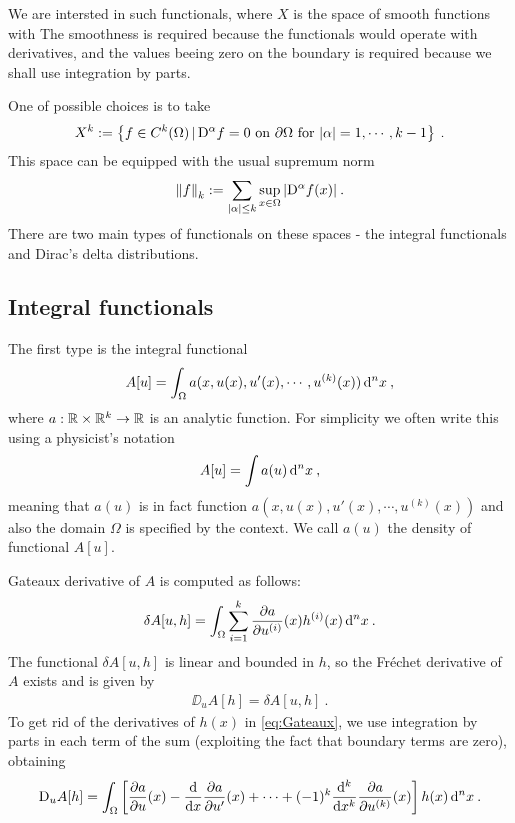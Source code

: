 We are intersted in such functionals, where $X$ is the space of smooth functions with The smoothness is required because the functionals would operate with derivatives, and the values beeing zero on the boundary is required because we shall use integration by parts.

One of possible choices is to take
\begin{align}
    X^k := \left \lbrace f \in C^k(\Omega) \,|\, \mathrm{D}^\alpha f = 0 \text{ on } \partial \Omega \text{ for } |\alpha| = 1, \cdots, k-1  \right \rbrace \:.
\end{align}
This space can be equipped with the usual supremum norm
\begin{align}
    \left \Vert f \right \Vert_k := \sum_{|\alpha| \leq k} \sup_{x \in \Omega} |\mathrm{D}^\alpha f(x)| \:.
\end{align}
There are two main types of functionals on these spaces -  the integral functionals and Dirac's delta distributions.

\subsection{Integral functionals}

The first type is the integral functional
\begin{align}
    A[u] = \int_\Omega a(x,u(x),u'(x),\cdots,u^{(k)}(x)) \, \mathrm{d}^n x \:, \label{eq:integral-functional}
\end{align}
where $a : \mathbb{R} \times \mathbb{R}^{k} \to \mathbb{R}$ is an analytic function.
For simplicity we often write this using a physicist's notation
\begin{align}
    A[u] = \int a(u) \, \mathrm{d}^n x \:,
\end{align}
meaning that $a(u)$ is in fact function $a(x,u(x),u'(x),\cdots, u^{(k)}(x))$ and also the domain $\Omega$ is specified by the context. We call $a(u)$ the density of functional $A[u]$.

Gateaux derivative of $A$ is computed as follows:
\begin{align}
    \delta A[u,h] = \int_\Omega \sum_{i=1}^k \frac{\partial a}{\partial u^{(i)}}(x) h^{(i)}(x) \, \mathrm{d}^n x \:. \label{eq:Gateaux}
\end{align}
The functional $\delta A[u,h]$ is linear and bounded in $h$, so the Fréchet derivative of $A$ exists and is given by
\begin{align}
    \DD_u A [h] = \delta A[u,h] \:.
\end{align}
To get rid of the derivatives of $h(x)$ in \eqref{eq:Gateaux}, we use integration by parts in each term of the sum (exploiting the fact that boundary terms are zero), obtaining
\begin{align}
    \mathrm{D}_u A [h] = \int_\Omega \left[ \frac{\partial a}{\partial u}(x) - \frac{\mathrm{d}}{\mathrm{d}x} \frac{\partial a}{\partial u'}(x) + \cdots + (-1)^k \frac{\mathrm{d}^k}{\mathrm{d}x^k} \frac{\partial a}{\partial u^{(k)}}(x) \right] h(x) \, \mathrm{d}^n x \:. \label{eq:perpartes}
\end{align}

